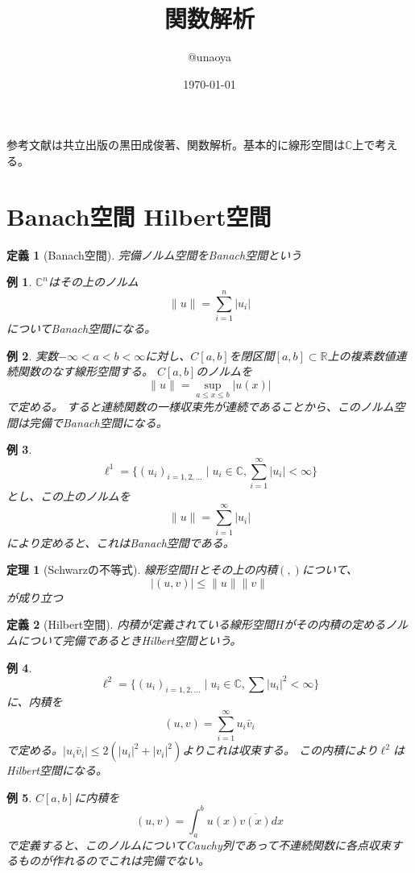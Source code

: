 \documentclass{jsarticle}
\title{関数解析}
\author{@unaoya}
\date{\today}
\newtheorem{dfn}{定義}
\newtheorem{eg}{例}
\newtheorem{thm}{定理}
\newcommand{\C}{\mathbb{C}}
\newcommand{\R}{\mathbb{R}}
\newcommand{\abs}[1]{|#1|}
\newcommand{\norm}[1]{\|#1\|}
\begin{document}
\maketitle
参考文献は共立出版の黒田成俊著、関数解析。基本的に線形空間は$\C$上で考える。
\section{Banach空間 Hilbert空間}
\begin{dfn}[Banach空間]
完備ノルム空間をBanach空間という
\end{dfn}

\begin{eg}
$\C^n$はその上のノルム
\[
\norm{u}=\sum^n_{i=1}\abs{u_i}
\]
についてBanach空間になる。
\end{eg}

\begin{eg}
実数$-\infty<a<b<\infty$に対し、$C[a,b]$を閉区間$[a,b]\subset\R$上の複素数値連続関数のなす線形空間する。
 $C[a,b]$のノルムを
\[
\norm{u}=\sup_{a\leq x\leq b}\abs{u(x)}
\]
で定める。
すると連続関数の一様収束先が連続であることから、このノルム空間は完備でBanach空間になる。
\end{eg}

\begin{eg}
\[
\ell^1=\{(u_i)_{i=1,2,\ldots} \mid u_i\in\C, \sum_{i=1}^\infty\abs{u_i}<\infty\}
\]
とし、この上のノルムを
\[
\norm{u}=\sum_{i=1}^\infty\abs{u_i}
\]
により定めると、これはBanach空間である。
\end{eg}

\begin{thm}[Schwarzの不等式]
線形空間$H$とその上の内積$(,)$について、
\[
\abs{(u,v)}\leq\norm{u}\norm{v}
\]
が成り立つ
\end{thm}

\begin{dfn}[Hilbert空間]
内積が定義されている線形空間$H$がその内積の定めるノルムについて完備であるときHilbert空間という。
\end{dfn}

\begin{eg}
\[
\ell^2=\{(u_i)_{i=1,2,\ldots}\mid u_i\in\C, \sum\abs{u_i}^2 < \infty\}
\]
に、内積を
\[
(u,v)=\sum_{i=1}^\infty u_i\bar{v}_i
\]
で定める。$\abs{u_i\bar{v}_i}\leq2(\abs{u_i}^2+\abs{v_i}^2)$よりこれは収束する。
この内積により$\ell^2$はHilbert空間になる。
\end{eg}

\begin{eg}
$C[a,b]$に内積を
\[
(u,v)=\int_a^bu(x)\overline{v(x)}dx
\]
で定義すると、このノルムについてCauchy列であって不連続関数に各点収束するものが作れるのでこれは完備でない。
\end{eg}
\end{document}
